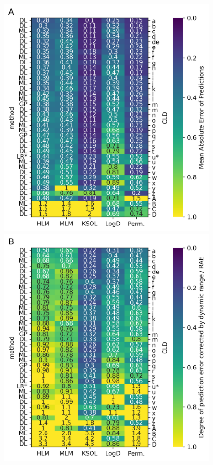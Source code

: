 \documentclass[journal=jcim,manuscript=article]{achemso}
\begin{document}
\begin{figure}
    \includegraphics[scale=0.6]{04_figs_leaderboards/mae.png}
    \includegraphics[scale=0.6]{04_figs_leaderboards/rae.png}

\end{figure}
\end{document}
